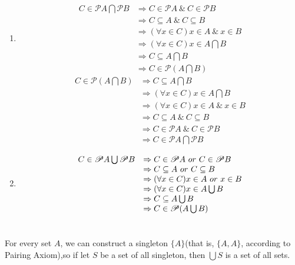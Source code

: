 \section{}
\begin{enumerate}
  \item 
  \[ \begin{array}{rl}
  C \in \mathscr{P}A\bigcap\mathscr{P}B 
  & \Rightarrow C \in \mathscr{P}A \ \&\ C \in \mathscr{P}B \\
  & \Rightarrow C \subseteq A \ \&\ C \subseteq B \\
  & \Rightarrow (\forall x \in C) x \in A \ \&\ x \in B  \\
  & \Rightarrow (\forall x \in C) x \in A\bigcap B \\
  & \Rightarrow C \subseteq A\bigcap B \\
  & \Rightarrow C \in \mathscr{P}(A\bigcap B)
  \end{array}\]
  \[ \begin{array}{rl}
  C \in \mathscr{P}(A\bigcap B)
  & \Rightarrow C \subseteq A\bigcap B \\
  & \Rightarrow (\forall x \in C) x \in A\bigcap B \\
  & \Rightarrow (\forall x \in C) x \in A \ \&\ x \in B  \\
  & \Rightarrow C \subseteq A \ \&\ C \subseteq B \\
  & \Rightarrow C \in \mathscr{P}A \ \&\ C \in \mathscr{P}B \\
  & \Rightarrow C \in \mathscr{P}A\bigcap\mathscr{P}B 
  \end{array}\]

  \item 
  \[ \begin{array}{rl}
  C \in \mathscr{P}A\bigcup\mathscr{P}B
  & \Rightarrow C \in \mathscr{P}A \ \mathnormal{or}\ C \in \mathscr{P}B \\
  & \Rightarrow C \subseteq A \ \mathnormal{or}\ C \subseteq B \\
  & \Rightarrow (\forall x \in C) x \in A \ \mathnormal{or}\ x \in B  \\
  & \Rightarrow (\forall x \in C) x \in A\bigcup B \\
  & \Rightarrow C \subseteq A\bigcup B \\
  & \Rightarrow C \in \mathscr{P}(A\bigcup B)
  \end{array}\]
\end{enumerate}


\section{}
For every set $A$, we can construct a singleton $ \{A\} $(that is, 
$\{A,A\}$, according to Pairing Axiom),so if let $S$ be a set of all
singleton, then $ \bigcup S $ is a set of all sets.


